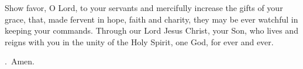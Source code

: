 \lettrine[lines=3]{S}{}how favor, O Lord, to your servants
and mercifully increase the gifts of your grace,
that, made fervent in hope, faith and charity,
they may be ever watchful in keeping your commands.
Through our Lord Jesus Christ, your Son,
who lives and reigns with you in the unity of the Holy Spirit,
one God, for ever and ever. \par \Rbar.~Amen.
